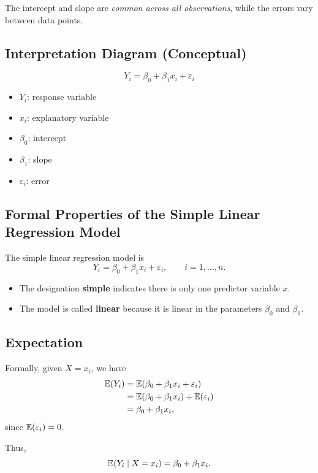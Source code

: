 The intercept and slope are \emph{common across all observations}, while the errors vary between data points.

\subsection{Interpretation Diagram (Conceptual)}

\[
Y_i = \beta_0 + \beta_1 x_i + \varepsilon_i
\]

\begin{itemize}
    \item $Y_i$: response variable
    \item $x_i$: explanatory variable
    \item $\beta_0$: intercept
    \item $\beta_1$: slope
    \item $\varepsilon_i$: error
\end{itemize}

\subsection{Formal Properties of the Simple Linear Regression Model}

The simple linear regression model is
\[
Y_i = \beta_0 + \beta_1 x_i + \varepsilon_i, \qquad i = 1, \dots, n.
\]

\begin{itemize}
    \item The designation \textbf{simple} indicates there is only one predictor variable $x$.
    \item The model is called \textbf{linear} because it is linear in the parameters $\beta_0$ and $\beta_1$.
\end{itemize}

\subsection{Expectation}

Formally, given $X = x_i$, we have
\[
\begin{aligned}
\mathbb{E}(Y_i)
&= \mathbb{E}(\beta_0 + \beta_1 x_i + \varepsilon_i) \\
&= \mathbb{E}(\beta_0 + \beta_1 x_i) + \mathbb{E}(\varepsilon_i) \\
&= \beta_0 + \beta_1 x_i,
\end{aligned}
\]
since $\mathbb{E}(\varepsilon_i) = 0$.

Thus,
\[
\mathbb{E}(Y_i \mid X = x_i) = \beta_0 + \beta_1 x_i.
\]

